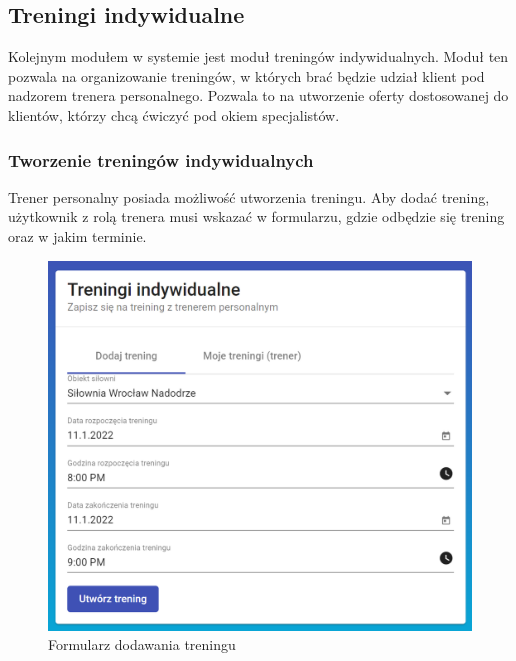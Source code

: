 \documentclass[a4paper,twoside,12pt]{book}
\begin{document}
{\subsection{Treningi indywidualne}
Kolejnym modułem w systemie jest moduł treningów indywidualnych. Moduł ten pozwala na organizowanie treningów, w których brać będzie udział klient pod nadzorem trenera personalnego. Pozwala to na utworzenie oferty dostosowanej do klientów, którzy chcą ćwiczyć pod okiem specjalistów.
\FloatBarrier

\newpage
\subsubsection{Tworzenie treningów indywidualnych}
Trener personalny posiada możliwość utworzenia treningu. Aby dodać trening, użytkownik z rolą trenera musi wskazać w formularzu, gdzie odbędzie się trening oraz w jakim terminie.
\begin{figure}[h!]
	\centering
	\includegraphics[width=1\linewidth]{../zrzuty_ekranu/dzialanie/treningi/dodawanie_treningu}
	\caption{Formularz dodawania treningu}
	\label{fig:dodawanietreningu}
\end{figure}
\FloatBarrier

}
\end{document}
